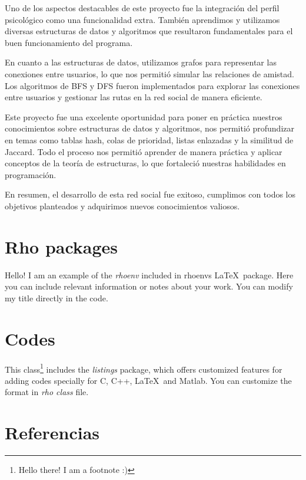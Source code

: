 \documentclass[9pt,letterpaper,onecolumn]{rho-class/rho}
\begin{document}
    Uno de los aspectos destacables de este proyecto fue la integración del perfil psicológico como una funcionalidad extra. También aprendimos y utilizamos diversas estructuras de datos y algoritmos que resultaron fundamentales para el buen funcionamiento del programa.

    En cuanto a las estructuras de datos, utilizamos grafos para representar las conexiones entre usuarios, lo que nos permitió simular las relaciones de amistad. Los algoritmos de BFS y DFS fueron implementados para explorar las conexiones entre usuarios y gestionar las rutas en la red social de manera eficiente.

    Este proyecto fue una excelente oportunidad para poner en práctica nuestros conocimientos sobre estructuras de datos y algoritmos, nos permitió profundizar en temas como tablas hash, colas de prioridad, listas enlazadas y la similitud de Jaccard. Todo el proceso nos permitió aprender de manera práctica y aplicar conceptos de la teoría de estructuras, lo que fortaleció nuestras habilidades en programación.

    En resumen, el desarrollo de esta red social fue exitoso, cumplimos con todos los objetivos planteados y adquirimos nuevos conocimientos valiosos.

\section{Rho packages}

        \begin{rhoenv}[frametitle=Environment with custom title]
            Hello! I am an example of the \textit{rhoenv} included in rhoenvs \LaTeX\ package. Here you can include relevant information or notes about your work. You can modify my title directly in the code.
        \end{rhoenv}

\section{Codes}

    This class\footnote{Hello there! I am a footnote :)} includes the \textit{listings} package, which offers customized features for adding codes specially for C, C++, \LaTeX\ and Matlab. You can customize the format in \textit{rho class} file.

    

    
        

\newpage
\section{Referencias}


\end{document}

